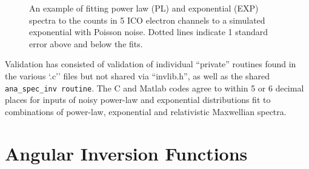 \documentclass{article}    %
\begin{document}
\begin{figure}
\caption{An example of fitting power law (PL) and exponential (EXP) spectra
  to the counts in 5 ICO electron channels to a simulated exponential
  with Poisson noise. Dotted lines indicate 1 standard error above and
  below the fits.}
\label{figAnalyticalFitExample}
\end{figure}

Validation has consisted of validation of individual ``private''
routines found in the various `.c'' files but not shared via
``invlib.h'', as well as the shared \verb|ana_spec_inv routine|. The C
and Matlab codes agree to within 5 or 6 decimal places for inputs of
noisy power-law and exponential distributions fit to combinations of
power-law, exponential and relativistic Maxwellian spectra.

\section{Angular Inversion Functions}
\end{document}
